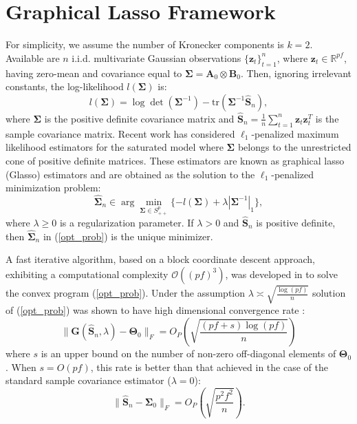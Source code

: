\documentclass[journal,11pt,draftcls,onecolumn]{IEEEtran}
\def\tr{{\rm tr}}
\def\bG{ {\mathbf{G}} }
\def\bS{ {\mathbf{S}} }
\def\bTheta{ {\mathbf{\Theta}} }
\def\bSigma{ {\mathbf{\Sigma}} }
\def\nn{{ \parallel   }}
\def\RR{{ \mathbb{R}  }}
\def\tr{{ \text{tr}   }}
\def\bz{{ \mathbf{z}  }}
\begin{document}
\section{Graphical Lasso Framework} \label{sec: glasso}
For simplicity, we assume the number of Kronecker components is $k=2$. Available are $n$ i.i.d. multivariate Gaussian observations $\{\bz_t\}_{t=1}^{n}$, where $\bz_t\in \RR^{pf}$, having zero-mean and covariance equal to $\mathbf{\Sigma} = \mathbf{A}_0 \otimes \mathbf{B}_0$. Then, ignoring irrelevant constants,  the log-likelihood  $l(\mathbf{\Sigma})$ is:
\begin{equation} \label{log_likelihood}
	l(\mathbf{\Sigma}) = \log\det(\mathbf{\Sigma}^{-1}) - \tr(\mathbf{\Sigma}^{-1}\hat{\mathbf{S}}_n),
\end{equation}
where $\mathbf{\Sigma}$ is the positive definite covariance matrix and $\hat{\mathbf{S}}_n=\frac{1}{n}\sum_{t=1}^{n}{\bz_t \bz_t^T}$ is the sample covariance matrix. Recent work \cite{ModelSel, Glasso, RWRY08} has considered $\ell_1$-penalized maximum likelihood estimators for the saturated model where $\bSigma$ belongs to the unrestricted cone of positive definite matrices. These estimators are known as graphical lasso (Glasso) estimators and are obtained as the solution to the $\ell_1$-penalized minimization problem:
\begin{equation} \label{opt_prob}
	\hat{\mathbf{\Sigma}}_n \in \arg \min_{\mathbf{\Sigma} \in S_{++}^p} { \{ -l(\mathbf{\Sigma}) + \lambda |\mathbf{\Sigma}^{-1}|_1 \} },
\end{equation}
where $\lambda \geq 0$ is a regularization parameter. If $\lambda>0$ and $\hat{\mathbf{S}}_n$ is positive definite, then $\hat{\mathbf{\Sigma}}_n$ in (\ref{opt_prob}) is the unique minimizer.

A fast iterative algorithm, based on a block coordinate descent approach, exhibiting a computational complexity $\mathcal{O}((pf)^3)$, was developed in \cite{Glasso} to solve the convex program (\ref{opt_prob}). Under the assumption $\lambda \asymp \sqrt{\frac{\log(pf)}{n}}$ solution of (\ref{opt_prob}) was shown to have high dimensional convergence rate \cite{Rothman, TimeVaryingGraphs}:
\begin{equation} \label{Glasso_rate}
 \nn \bG(\hat{\bS}_n, \lambda)-\bTheta_0 \nn_F = O_P\left( \sqrt{\frac{(pf+s) \log(pf)}{n}} \right)
\end{equation}
where $s$ is an upper bound on the number of non-zero off-diagonal elements of $\bTheta_0$. When $s=O(pf)$, this rate is better than that achieved in the case of the standard sample covariance estimator ($\lambda=0$):
\begin{equation} \label{naive_SCM_rate}
	\nn \hat{\bS}_n - \bSigma_0 \nn_F = O_P\left( \sqrt{\frac{p^2f^2}{n}} \right).
\end{equation}
\end{document}
